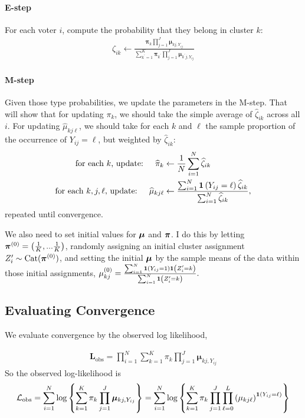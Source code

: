 \documentclass[11pt]{article}
\begin{document}
\paragraph{E-step} For each voter \(i\), compute the probability that they belong in cluster \(k\):
\begin{align}
\zeta_{ik} \leftarrow \frac{\bm{\pi}_{k}\prod^{J}_{j=1}\bm{\mu}_{kj,Y_{ij}}}
{\sum^{K}_{k^\prime=1}\bm{\pi}_{k^\prime}\prod^{J}_{j=1}\bm{\mu}_{k^\prime j,Y_{ij}}}
\end{align}

\paragraph{M-step} Given those type probabilities, we update the parameters in the M-step. That will show that for updating \(\pi_k\), we should take the simple average of \(\widehat\zeta_{ik}\) across all \(i\). For updating \(\widehat\mu_{kj\ell}\), we should take for each \(k\) and \(\ell\) the sample proportion of the occurrence of \(Y_{ij} = \ell\), but weighted by \(\widehat\zeta_{ik}\):
\begin{align}
\text{for each \(k\), update: }~~~  \widehat{\pi}_{k} &\leftarrow \frac{1}{N}\sum^N_{i = 1}\widehat{\zeta}_{ik} \\
\text{for each \(k, j, \ell\), update: }~~~ \widehat{\mu}_{kj\ell} &\leftarrow\frac{\sum^N_{i=1}\bm{1}\left(Y_{ij} = \ell\right)\widehat{\zeta}_{ik}}{\sum^{N}_{i=1}\widehat{\zeta}_{ik}},
\end{align}
repeated  until convergence.

We also need to set initial values for \(\bm{\mu}\) and \(\bm{\pi}\). I do this by letting \(\bm{\pi}^{(0)} = \left(\frac{1}{K},...\frac{1}{K}\right)\), randomly assigning an initial cluster assignment \(Z_i^\prime \sim \text{Cat}(\bm{\pi}^{(0)})\), and setting the initial \(\bm{\mu}\) by the sample means of the data within those initial assignments, \(\mu_{kj}^{(0)} = \frac{\sum_{i=1}^{N}\bm{1}\left(Y_{ij} = 1\right)\bm{1}\left(Z_{i}^{\prime} = k\right)}{\sum_{i=1}^{N}\bm{1}\left(Z_{i}^{\prime} = k\right)}.\)


\subsection{Evaluating Convergence}

We evaluate convergence by the observed log likelihood,

\begin{align*}
\mathbf{L}_{\text{obs}} = \prod^N_{i=1}\sum^{K}_{k=1}\pi_k \prod^{J}_{j=1}\bm{\mu}_{kj,Y_{ij}}
\end{align*}
So the observed log-likelihood is
\begin{align}
\mathcal{L}_{\text{obs}} = \sum^{N}_{i=1}\log \left\{\sum^{K}_{k=1}\pi_k \prod^{J}_{j=1}\bm{\mu}_{kj,Y_{ij}}\right\} = \sum^{N}_{i=1}\log \left\{\sum^{K}_{k=1}\pi_k \prod^{J}_{j=1}\prod^{L}_{\ell = 0}\left(\mu_{kj\ell}\right)^{\bm{1}\left(Y_{ij} = \ell\right)}\right\} \label{eq:obsloglik}
\end{align}
\end{document}
